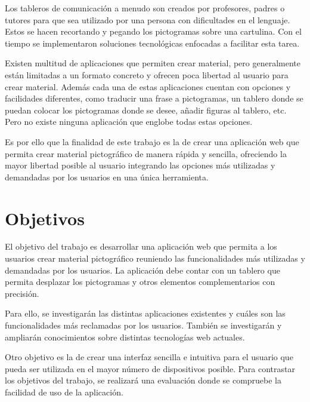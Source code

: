 Los tableros de comunicación a menudo son creados por profesores, padres o tutores para que sea utilizado por una persona con dificultades en el lenguaje. Estos se hacen recortando y pegando los pictogramas sobre una cartulina. Con el tiempo se implementaron soluciones tecnológicas enfocadas a facilitar esta tarea. 

Existen multitud de aplicaciones que permiten crear material, pero generalmente están limitadas a un formato concreto y ofrecen poca libertad al usuario para crear material. Además cada una de estas aplicaciones cuentan con opciones y facilidades diferentes, como traducir una frase a pictogramas, un tablero donde se puedan colocar los pictogramas donde se desee, añadir figuras al tablero, etc. Pero no existe ninguna aplicación que englobe todas estas opciones. 

Es por ello que la finalidad de este trabajo es la de crear una aplicación web que permita crear material pictográfico de manera rápida y sencilla, ofreciendo la mayor libertad posible al usuario integrando las opciones más utilizadas y demandadas por los usuarios en una única herramienta. 
 





\section{Objetivos}
\label{cap1:sec:Objetivos}



El objetivo del trabajo es desarrollar una aplicación web que permita a los usuarios crear material pictográfico reuniendo las funcionalidades más utilizadas y demandadas por los usuarios. La aplicación debe contar con un tablero que permita desplazar los pictogramas y otros elementos complementarios con precisión.

Para ello, se investigarán las distintas aplicaciones existentes y cuáles son las funcionalidades más reclamadas por los usuarios. También se investigarán y ampliarán conocimientos sobre distintas tecnologías web actuales. 

Otro objetivo es la de crear una interfaz sencilla e intuitiva para el usuario que pueda ser utilizada en el mayor número de dispositivos posible. Para contrastar los objetivos del trabajo, se realizará una evaluación donde se compruebe la facilidad de uso de la aplicación. 










